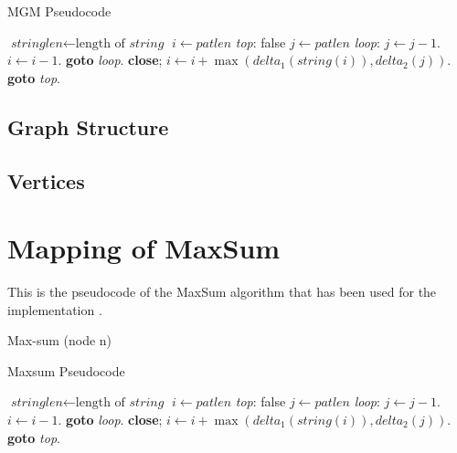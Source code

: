     \begin{algorithm}
\caption{MGM Pseudocode}\label{euclid}
\begin{algorithmic}[2]
\State $\textit{stringlen} \gets \text{length of }\textit{string}$
\State $i \gets \textit{patlen}$
\BState \emph{top}:
 \Return false
\EndIf
\State $j \gets \textit{patlen}$
\BState \emph{loop}:
\State $j \gets j-1$.
\State $i \gets i-1$.
\State \textbf{goto} \emph{loop}.
\State \textbf{close};
\EndIf
\State $i \gets i+\max(\textit{delta}_1(\textit{string}(i)),\textit{delta}_2(j))$.
\State \textbf{goto} \emph{top}.
\EndProcedure
\end{algorithmic}
\end{algorithm}

\subsection{Graph Structure}
\subsection{Vertices}

\section{Mapping of MaxSum}

    
This is the pseudocode of the MaxSum algorithm that has been used for the implementation \cite{Zivan2012}.

Max-sum (node n)

    \begin{algorithm}
\caption{Maxsum Pseudocode}\label{euclid}
\begin{algorithmic}[3]
\State $\textit{stringlen} \gets \text{length of }\textit{string}$
\State $i \gets \textit{patlen}$
\BState \emph{top}:
 \Return false
\EndIf
\State $j \gets \textit{patlen}$
\BState \emph{loop}:
\State $j \gets j-1$.
\State $i \gets i-1$.
\State \textbf{goto} \emph{loop}.
\State \textbf{close};
\EndIf
\State $i \gets i+\max(\textit{delta}_1(\textit{string}(i)),\textit{delta}_2(j))$.
\State \textbf{goto} \emph{top}.
\EndProcedure
\end{algorithmic}
\end{algorithm}

